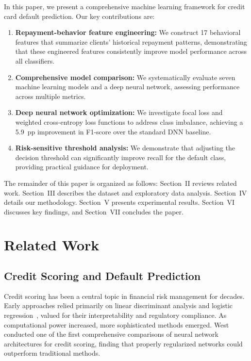 \documentclass[conference]{IEEEtran}
\begin{document}
In this paper, we present a comprehensive machine learning framework for credit card default prediction. Our key contributions are:

\begin{enumerate}
    \item \textbf{Repayment-behavior feature engineering:} We construct 17 behavioral features that summarize clients' historical repayment patterns, demonstrating that these engineered features consistently improve model performance across all classifiers.
    \item \textbf{Comprehensive model comparison:} We systematically evaluate seven machine learning models and a deep neural network, assessing performance across multiple metrics.
    \item \textbf{Deep neural network optimization:} We investigate focal loss and weighted cross-entropy loss functions to address class imbalance, achieving a 5.9~pp improvement in F1-score over the standard DNN baseline.
    \item \textbf{Risk-sensitive threshold analysis:} We demonstrate that adjusting the decision threshold can significantly improve recall for the default class, providing practical guidance for deployment.
\end{enumerate}

The remainder of this paper is organized as follows: Section~II reviews related work. Section~III describes the dataset and exploratory data analysis. Section~IV details our methodology. Section~V presents experimental results. Section~VI discusses key findings, and Section~VII concludes the paper.

\section{Related Work}

\subsection{Credit Scoring and Default Prediction}
Credit scoring has been a central topic in financial risk management for decades. Early approaches relied primarily on linear discriminant analysis and logistic regression~\cite{hand2005good}, valued for their interpretability and regulatory compliance. As computational power increased, more sophisticated methods emerged. West~\cite{west2000neural} conducted one of the first comprehensive comparisons of neural network architectures for credit scoring, finding that properly regularized networks could outperform traditional methods.
\end{document}
